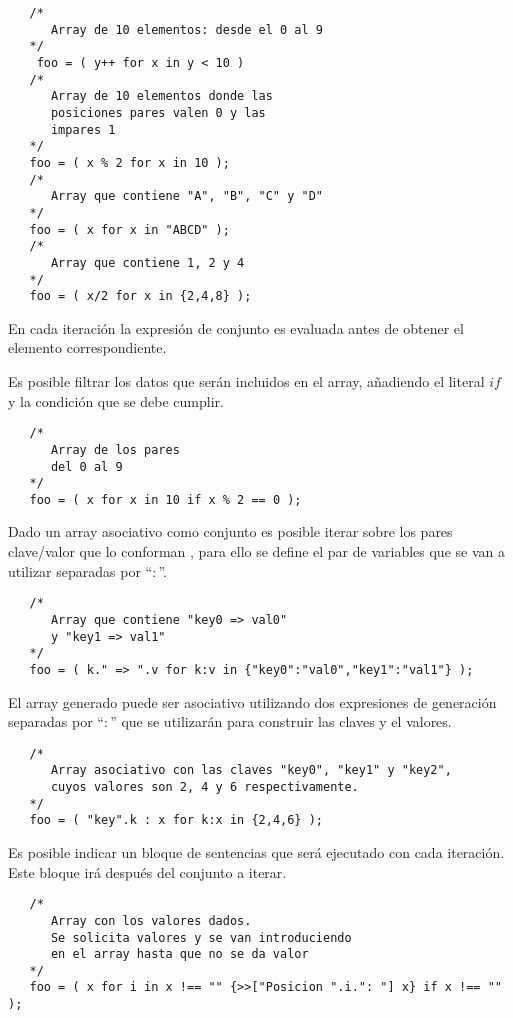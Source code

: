 \begin{lstlisting}
   /*
      Array de 10 elementos: desde el 0 al 9
   */
    foo = ( y++ for x in y < 10 )
   /*
      Array de 10 elementos donde las 
      posiciones pares valen 0 y las
      impares 1
   */
   foo = ( x % 2 for x in 10 ); 
   /*
      Array que contiene "A", "B", "C" y "D"
   */
   foo = ( x for x in "ABCD" ); 
   /*
      Array que contiene 1, 2 y 4
   */
   foo = ( x/2 for x in {2,4,8} ); 
\end{lstlisting}



En cada iteración la expresión de conjunto es evaluada antes de obtener el elemento correspondiente.

Es posible filtrar los datos que serán incluidos en el array, añadiendo el literal
$if$ y la condición que se debe cumplir. \\

\begin{lstlisting}
   /*
      Array de los pares
      del 0 al 9
   */
   foo = ( x for x in 10 if x % 2 == 0 );
\end{lstlisting}

Dado un array asociativo como conjunto es posible iterar sobre los pares clave/valor que lo conforman ,
para ello se define el par de variables que se van a utilizar separadas por ``$:$''. \\

\begin{lstlisting}
   /*
      Array que contiene "key0 => val0"
      y "key1 => val1"
   */
   foo = ( k." => ".v for k:v in {"key0":"val0","key1":"val1"} );
\end{lstlisting}

El array generado puede ser asociativo utilizando dos expresiones de generación separadas por 
``$:$'' que se utilizarán para construir las claves y el valores. \\

\begin{lstlisting}
   /*
      Array asociativo con las claves "key0", "key1" y "key2",
      cuyos valores son 2, 4 y 6 respectivamente.
   */
   foo = ( "key".k : x for k:x in {2,4,6} );
\end{lstlisting}

Es posible indicar un bloque de sentencias que será ejecutado 
con cada iteración. Este bloque irá después del conjunto a iterar. \\

\begin{lstlisting}
   /*
      Array con los valores dados.
      Se solicita valores y se van introduciendo
      en el array hasta que no se da valor 
   */
   foo = ( x for i in x !== "" {>>["Posicion ".i.": "] x} if x !== "" );
\end{lstlisting}


